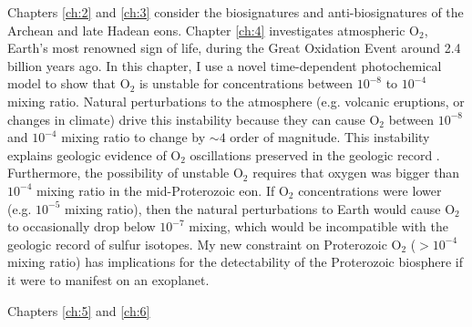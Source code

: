 Chapters \ref{ch:2} and \ref{ch:3} consider the biosignatures and anti-biosignatures of the Archean and late Hadean eons. Chapter \ref{ch:4} investigates atmospheric O$_2$, Earth's most renowned sign of life, during the Great Oxidation Event around 2.4 billion years ago. In this chapter, I use a novel time-dependent photochemical model to show that O$_2$ is unstable for concentrations between $10^{-8}$ to $10^{-4}$ mixing ratio. Natural perturbations to the atmosphere (e.g. volcanic eruptions, or changes in climate) drive this instability because they can cause O$_2$ between $10^{-8}$ and $10^{-4}$ mixing ratio to change by $\sim 4$ order of magnitude. This instability explains geologic evidence of O$_2$ oscillations preserved in the geologic record \citep{Poulton_2021}. Furthermore, the possibility of unstable O$_2$ requires that oxygen was bigger than $10^{-4}$ mixing ratio in the mid-Proterozoic eon. If O$_2$ concentrations were lower (e.g. $10^{-5}$ mixing ratio), then the natural perturbations to Earth would cause O$_2$ to occasionally drop below $10^{-7}$ mixing, which would be incompatible with the geologic record of sulfur isotopes. My new constraint on Proterozoic O$_2$ ($> 10^{-4}$ mixing ratio) has implications for the detectability of the Proterozoic biosphere if it were to manifest on an exoplanet.

Chapters \ref{ch:5} and \ref{ch:6} 
